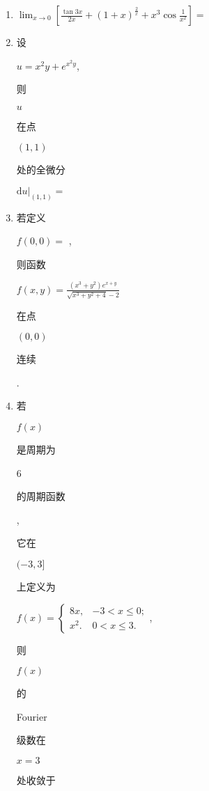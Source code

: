 \documentclass[10pt]{article}
\begin{document}
\begin{enumerate}
  \item $\lim _{x \rightarrow 0}\left[\frac{\tan 3 x}{2 x}+(1+x)^{\frac{2}{x}}+x^{3} \cos \frac{1}{x^{2}}\right]=$

  \item \begin{CJK}{UTF8}{mj}设\end{CJK} $u=x^{2} y+e^{x^{2} y}$, \begin{CJK}{UTF8}{mj}则\end{CJK} $u$ \begin{CJK}{UTF8}{mj}在点\end{CJK} $(1,1)$ \begin{CJK}{UTF8}{mj}处的全微分\end{CJK} $\left.\mathrm{d} u\right|_{(1,1)}=$

  \item \begin{CJK}{UTF8}{mj}若定义\end{CJK} $f(0,0)=$ , \begin{CJK}{UTF8}{mj}则函数\end{CJK} $f(x, y)=\frac{\left(x^{3}+y^{2}\right) e^{x+y}}{\sqrt{x^{3}+y^{2}+4}-2}$ \begin{CJK}{UTF8}{mj}在点\end{CJK} $(0,0)$ \begin{CJK}{UTF8}{mj}连续\end{CJK}.

  \item \begin{CJK}{UTF8}{mj}若\end{CJK} $f(x)$ \begin{CJK}{UTF8}{mj}是周期为\end{CJK} 6 \begin{CJK}{UTF8}{mj}的周期函数\end{CJK}, \begin{CJK}{UTF8}{mj}它在\end{CJK} $(-3,3]$ \begin{CJK}{UTF8}{mj}上定义为\end{CJK} $f(x)=\left\{\begin{array}{ll}8 x, & -3<x \leqslant 0 ; \\ x^{2} . & 0<x \leqslant 3 .\end{array}\right.$, \begin{CJK}{UTF8}{mj}则\end{CJK} $f(x)$ \begin{CJK}{UTF8}{mj}的\end{CJK} Fourier \begin{CJK}{UTF8}{mj}级数在\end{CJK} $x=3$ \begin{CJK}{UTF8}{mj}处收敛于\end{CJK}


\end{enumerate}
\end{document}
